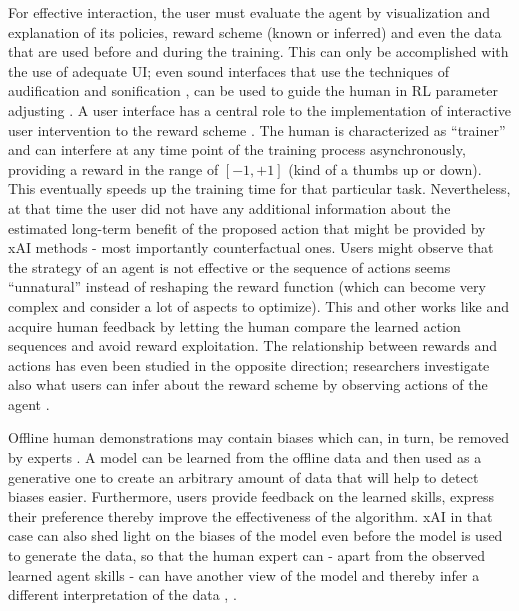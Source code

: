 For effective interaction, the user must evaluate the agent by visualization and explanation of its policies, reward scheme (known or inferred) and even the data that are used before and during the training. This can only be accomplished with the use of adequate UI; even sound interfaces that use the techniques of audification and sonification \cite{Hermann:2011:Sonification}, \cite{Saranti:2009:QuantumHarmonicOscSonification} can be used to guide the human in RL parameter adjusting \cite{Scurto:2021:DesigningDeepRLHumanParameterExploration}. 
A user interface has a central role to the implementation of interactive user intervention to the reward scheme \cite{Thomaz:2006:RLWithHumanTeachers}. The human is characterized as ``trainer'' and can interfere at any time point of the training process asynchronously, providing a reward in the range of $[-1, +1]$ (kind of a thumbs up or down). This eventually speeds up the training time for that particular task. Nevertheless, at that time the user did not have any additional information about the estimated long-term benefit of the proposed action that might be provided by xAI methods - most importantly counterfactual ones. Users might observe that the strategy of an agent is not effective or the sequence of actions seems ``unnatural'' instead of reshaping the reward function (which can become very complex and consider a lot of aspects to optimize). This and other works like \cite{Christiano:2017:DeepRLHumanPreferences} and \cite{LeeSmithAbbeel:2021:FeedbackPreferenceHITLLearningPEBBLE} acquire human feedback by letting the human compare the learned action sequences and avoid reward exploitation. The relationship between rewards and actions has even been studied in the opposite direction; researchers investigate also what users can infer about the reward scheme by observing actions of the agent \cite{Abbeel:2004:InverseRL}.

 Offline human demonstrations may contain biases which can, in turn, be removed by experts  \cite{Wang:2022:SkillPreferences}. A model can be learned from the offline data and then used as a generative one to create an arbitrary amount of data that will help to detect biases easier. Furthermore, users provide feedback on the learned skills, express their preference thereby improve the effectiveness of the algorithm. xAI in that case can also shed light on the biases of the model even before the model is used to generate the data, so that the human expert can - apart from the observed learned agent skills - can have another view of the model and thereby infer a different interpretation of the data \cite{Ribeiro:2016:WhyShouldITrustYou}, \cite{Mehrabi:2021:SurveyBiasFairness}.

